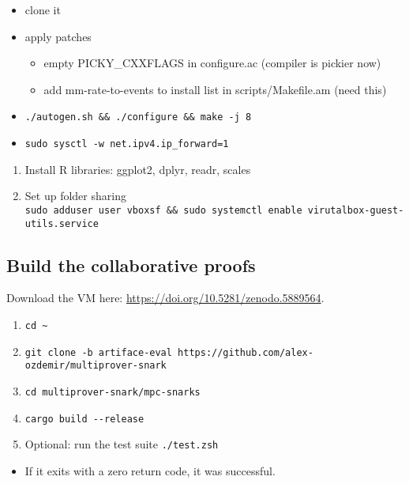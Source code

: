 \begin{itemize}
\tightlist
\item
  clone it
\item
  apply patches

  \begin{itemize}
  \tightlist
  \item
    empty PICKY\_CXXFLAGS in configure.ac (compiler is pickier now)
  \item
    add mm-rate-to-events to install list in scripts/Makefile.am (need
    this)
  \end{itemize}
\item
  \texttt{./autogen.sh\ \&\&\ ./configure\ \&\&\ make\ -j\ 8}
\item
  \texttt{sudo\ sysctl\ -w\ net.ipv4.ip\_forward=1}
\end{itemize}

\begin{enumerate}
\def\labelenumi{\arabic{enumi}.}
\setcounter{enumi}{6}
\tightlist
\item
  Install R libraries: ggplot2, dplyr, readr, scales
\item
  Set up folder sharing
  \texttt{sudo\ adduser\ user\ vboxsf\ \&\&\ sudo\ systemctl\ enable\ virutalbox-guest-utils.service}
\end{enumerate}

\hypertarget{build-the-collaborative-proofs-1}{%
\subsection{Build the collaborative
proofs}\label{build-the-collaborative-proofs-1}}

Download the VM here: \url{https://doi.org/10.5281/zenodo.5889564}.

\begin{enumerate}
\def\labelenumi{\arabic{enumi}.}
\tightlist
\item
  \texttt{cd\ \textasciitilde{}}
\item
  \texttt{git\ clone\ -b\ artiface-eval\ https://github.com/alex-ozdemir/multiprover-snark}
\item
  \texttt{cd\ multiprover-snark/mpc-snarks}
\item
  \texttt{cargo\ build\ -\/-release}
\item
  Optional: run the test suite \texttt{./test.zsh}
\end{enumerate}

\begin{itemize}
\tightlist
\item
  If it exits with a zero return code, it was successful.
\end{itemize}


